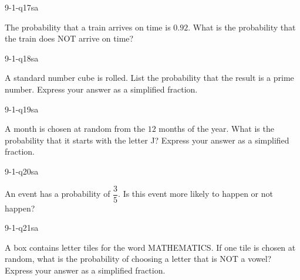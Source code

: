 \begin{practiceQuestion}{9-1-q17}{sa}
\begin{questionText}
The probability that a train arrives on time is $0.92$. What is the probability that the train does NOT arrive on time?
\end{questionText}
\end{practiceQuestion}

\begin{practiceQuestion}{9-1-q18}{sa}
\begin{questionText}
A standard number cube is rolled. List the probability that the result is a prime number. Express your answer as a simplified fraction.
\end{questionText}
\end{practiceQuestion}

\begin{practiceQuestion}{9-1-q19}{sa}
\begin{questionText}
A month is chosen at random from the $12$ months of the year. What is the probability that it starts with the letter J? Express your answer as a simplified fraction.
\end{questionText}
\end{practiceQuestion}

\begin{practiceQuestion}{9-1-q20}{sa}
\begin{questionText}
An event has a probability of $\dfrac{3}{5}$. Is this event more likely to happen or not happen?
\end{questionText}
\end{practiceQuestion}

\begin{practiceQuestion}{9-1-q21}{sa}
\begin{questionText}
A box contains letter tiles for the word MATHEMATICS. If one tile is chosen at random, what is the probability of choosing a letter that is NOT a vowel? Express your answer as a simplified fraction.
\end{questionText}
\end{practiceQuestion}

